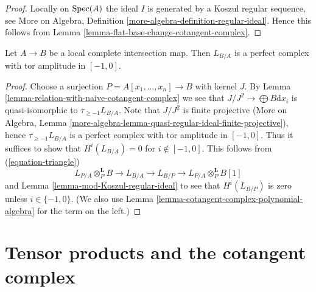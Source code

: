 \begin{proof}
Locally on $\mathop{\mathrm{Spec}}(A)$ the ideal $I$ is generated by a Koszul regular
sequence, see More on Algebra, Definition
\ref{more-algebra-definition-regular-ideal}.
Hence this follows from
Lemma \ref{lemma-flat-base-change-cotangent-complex}.
\end{proof}

\begin{proposition}
\label{proposition-cotangent-complex-local-complete-intersection}
Let $A \to B$ be a local complete intersection map.
Then $L_{B/A}$ is a perfect complex with tor amplitude in $[-1, 0]$.
\end{proposition}

\begin{proof}
Choose a surjection $P = A[x_1, \ldots, x_n] \to B$ with kernel $J$.
By Lemma \ref{lemma-relation-with-naive-cotangent-complex}
we see that $J/J^2 \to \bigoplus B\text{d}x_i$
is quasi-isomorphic to $\tau_{\geq -1}L_{B/A}$.
Note that $J/J^2$ is finite projective
(More on Algebra, Lemma
\ref{more-algebra-lemma-quasi-regular-ideal-finite-projective}),
hence $\tau_{\geq -1}L_{B/A}$ is a perfect complex with
tor amplitude in $[-1, 0]$.
Thus it suffices to show that $H^i(L_{B/A}) = 0$ for $i \not \in [-1, 0]$.
This follows from (\ref{equation-triangle})
$$
L_{P/A} \otimes_P^\mathbf{L} B \to L_{B/A} \to L_{B/P} \to
L_{P/A} \otimes_P^\mathbf{L} B[1]
$$
and Lemma \ref{lemma-mod-Koszul-regular-ideal}
to see that $H^i(L_{B/P})$ is zero unless $i \in \{-1, 0\}$.
(We also use Lemma \ref{lemma-cotangent-complex-polynomial-algebra}
for the term on the left.)
\end{proof}








\section{Tensor products and the cotangent complex}
\label{section-tensor-product}

